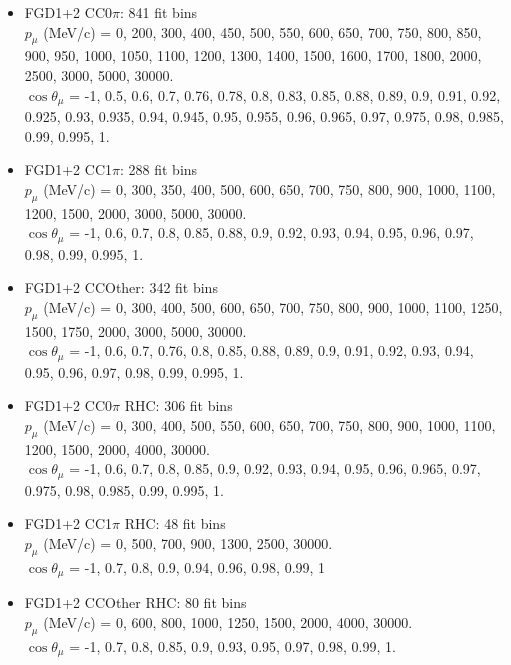 \begin{itemize}
	\item FGD1+2 CC0$\pi$: 841 fit bins\\
	$p_\mu$ (MeV/c) = 0, 200, 300, 400, 450, 500, 550, 600, 650, 700, 750, 800, 850, 900, 950, 1000, 1050, 1100, 1200, 1300, 1400, 1500, 1600, 1700, 1800, 2000, 2500, 3000, 5000, 30000.\\
	$\cos\theta_\mu$ = -1, 0.5, 0.6, 0.7, 0.76, 0.78, 0.8, 0.83, 0.85, 0.88, 0.89, 0.9, 0.91, 0.92, 0.925, 0.93, 0.935, 0.94, 0.945, 0.95, 0.955, 0.96, 0.965, 0.97, 0.975, 0.98, 0.985, 0.99, 0.995, 1.
	
	\item FGD1+2 CC1$\pi$: 288 fit bins\\
	$p_\mu$ (MeV/c) = 0, 300, 350, 400, 500, 600, 650, 700, 750, 800, 900, 1000, 1100, 1200, 1500, 2000, 3000, 5000, 30000.\\
	$\cos\theta_\mu$ = -1, 0.6, 0.7, 0.8, 0.85, 0.88, 0.9, 0.92, 0.93, 0.94, 0.95, 0.96, 0.97, 0.98, 0.99, 0.995, 1.
	
	\item FGD1+2 CCOther: 342 fit bins\\
	$p_\mu$ (MeV/c) = 0, 300, 400, 500, 600, 650, 700, 750, 800, 900, 1000, 1100, 1250, 1500, 1750, 2000, 3000, 5000, 30000.\\
	$\cos\theta_\mu$ = -1, 0.6, 0.7, 0.76, 0.8, 0.85, 0.88, 0.89, 0.9, 0.91, 0.92, 0.93, 0.94, 0.95, 0.96, 0.97, 0.98, 0.99, 0.995, 1.
	
	\item FGD1+2 CC0$\pi$ RHC: 306 fit bins\\
	$p_\mu$ (MeV/c) = 0, 300, 400, 500, 550, 600, 650, 700, 750, 800, 900, 1000, 1100, 1200, 1500, 2000, 4000, 30000.\\
	$\cos\theta_\mu$ = -1, 0.6, 0.7, 0.8, 0.85, 0.9, 0.92, 0.93, 0.94, 0.95, 0.96, 0.965, 0.97, 0.975, 0.98, 0.985, 0.99, 0.995, 1.
	
	\item FGD1+2 CC1$\pi$ RHC: 48 fit bins \\
	$p_\mu$ (MeV/c) = 0, 500, 700, 900, 1300, 2500, 30000.\\
	$\cos\theta_\mu$ = -1, 0.7, 0.8, 0.9, 0.94, 0.96, 0.98, 0.99, 1
	
	\item FGD1+2 CCOther RHC: 80 fit bins \\
	$p_\mu$ (MeV/c) = 0, 600, 800, 1000, 1250, 1500, 2000, 4000, 30000.\\
	$\cos\theta_\mu$ = -1, 0.7, 0.8, 0.85, 0.9, 0.93, 0.95, 0.97, 0.98, 0.99, 1.
	

\end{itemize}
